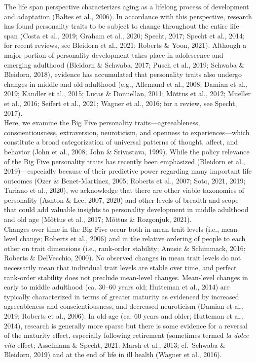 \documentclass[
  english,
  man, noextraspace]{apa7}
\begin{document}
The life span perspective characterizes aging as a lifelong process of development and adaptation (Baltes et al., 2006). In accordance with this perspective, research has found personality traits to be subject to change throughout the entire life span (Costa et al., 2019; Graham et al., 2020; Specht, 2017; Specht et al., 2014; for recent reviews, see Bleidorn et al., 2021; Roberts \& Yoon, 2021). Although a major portion of personality development takes place in adolescence and emerging adulthood (Bleidorn \& Schwaba, 2017; Pusch et al., 2019; Schwaba \& Bleidorn, 2018), evidence has accumulated that personality traits also undergo changes in middle and old adulthood (e.g., Allemand et al., 2008; Damian et al., 2019; Kandler et al., 2015; Lucas \& Donnellan, 2011; Mõttus et al., 2012; Mueller et al., 2016; Seifert et al., 2021; Wagner et al., 2016; for a review, see Specht, 2017).\\
Here, we examine the Big Five personality traits---agreeableness, conscientiousness, extraversion, neuroticism, and openness to experiences---which constitute a broad categorization of universal patterns of thought, affect, and behavior (John et al., 2008; John \& Srivastava, 1999). While the policy relevance of the Big Five personality traits has recently been emphasized (Bleidorn et al., 2019)---especially because of their predictive power regarding many important life outcomes (Ozer \& Benet-Martínez, 2005; Roberts et al., 2007; Soto, 2021, 2019; Turiano et al., 2020), we acknowledge that there are other viable taxonomies of personality (Ashton \& Lee, 2007, 2020) and other levels of breadth and scope that could add valuable insights to personality development in middle adulthood and old age (Mõttus et al., 2017; Mõttus \& Rozgonjuk, 2021).\\
Changes over time in the Big Five occur both in mean trait levels (i.e., mean-level change; Roberts et al., 2006) and in the relative ordering of people to each other on trait dimensions (i.e., rank-order stability; Anusic \& Schimmack, 2016; Roberts \& DelVecchio, 2000). No observed changes in mean trait levels do not necessarily mean that individual trait levels are stable over time, and perfect rank-order stability does not preclude mean-level changes. Mean-level changes in early to middle adulthood (ca. 30--60 years old; Hutteman et al., 2014) are typically characterized in terms of greater maturity as evidenced by increased agreeableness and conscientiousness, and decreased neuroticism (Damian et al., 2019; Roberts et al., 2006). In old age (ca. 60 years and older; Hutteman et al., 2014), research is generally more sparse but there is some evidence for a reversal of the maturity effect, especially following retirement (sometimes termed \emph{la dolce vita} effect; Asselmann \& Specht, 2021; Marsh et al., 2013; cf.~Schwaba \& Bleidorn, 2019) and at the end of life in ill health (Wagner et al., 2016).\\
\end{document}
